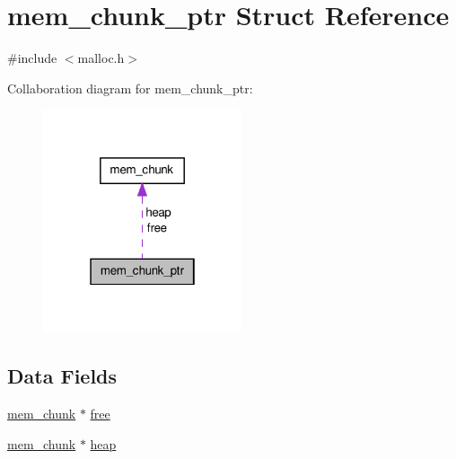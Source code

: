 \hypertarget{structmem__chunk__ptr}{\section{mem\-\_\-chunk\-\_\-ptr Struct Reference}
\label{structmem__chunk__ptr}
}


{\ttfamily \#include $<$malloc.\-h$>$}



Collaboration diagram for mem\-\_\-chunk\-\_\-ptr\-:\nopagebreak
\begin{figure}[H]
\begin{center}
\leavevmode
\includegraphics[width=166pt]{structmem__chunk__ptr__coll__graph}
\end{center}
\end{figure}
\subsection*{Data Fields}
\begin{DoxyCompactItemize}
\item 
\hyperlink{structmem__chunk}{mem\-\_\-chunk} $\ast$ \hyperlink{structmem__chunk__ptr_af7a1f60b420bd7ef98dde5a4cbc5bdf3}{free}
\item 
\hyperlink{structmem__chunk}{mem\-\_\-chunk} $\ast$ \hyperlink{structmem__chunk__ptr_aaddfb089e921369846e272d2d2b56e84}{heap}
\end{DoxyCompactItemize}


